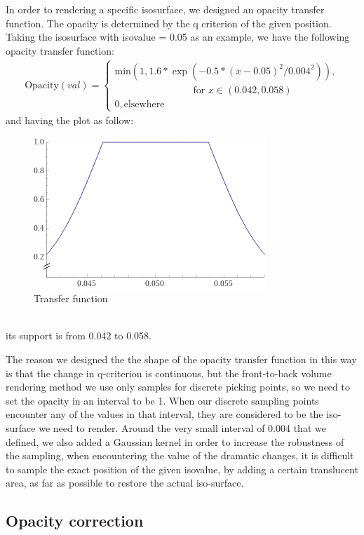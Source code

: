 \documentclass[acmtog]{acmart}
\begin{document}
In order to rendering a specific isosurface, we designed an opacity transfer function. The opacity is determined by the q criterion of the given position. Taking the isosurface with isovalue = 0.05 as an example, we have the following opacity transfer function:
\begin{align*}
	\text{Opacity}(val) = \begin{cases}
		\text{min}(1, 1.6*\exp(-0.5*(x - 0.05)^2 / 0.004^2)), \\
		\quad \quad \quad \quad \quad \quad \quad \quad \text{for }x \in (0.042, 0.058)\\
		0, \text{elsewhere}
	\end{cases}
\end{align*}
and having the plot as follow:
\begin{figure}[h] 
	\centering	
	\includegraphics[width=0.6\linewidth]{images/opacity.png}
	\caption{Transfer function}
\end{figure}\\
its support is from 0.042 to 0.058.


The reason we designed the the shape of the opacity transfer function in this way is that the change in q-criterion is continuous, but the front-to-back volume rendering method we use only samples for discrete picking points, so we need to set the opacity in an interval to be 1. When our discrete sampling points encounter any of the values in that interval, they are considered to be the iso-surface we need to render. Around the very small interval of 0.004 that we defined, we also added a Gaussian kernel in order to increase the robustness of the sampling, when encountering the value of the dramatic changes, it is difficult to sample the exact position of the given isovalue, by adding a certain translucent area, as far as possible to restore the actual iso-surface.


\subsection{Opacity correction}
\end{document}
